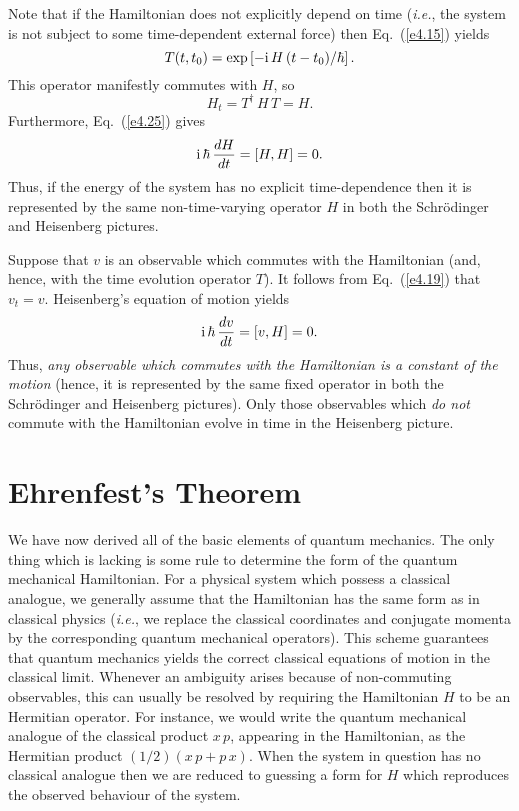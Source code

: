Note that if the Hamiltonian does not explicitly depend on time ({\em i.e.}, the system is
not subject to some time-dependent external force) then Eq.~(\ref{e4.15}) yields
\begin{equation}\label{e4.28}
T(t, t_0) = \exp\left[-{\rm i}\, H\,(t-t_0)/\hbar \right].
\end{equation}
This operator manifestly commutes with $H$, so 
\begin{equation}
H_t = T^{\dag}\, H \,T = H.
\end{equation}
Furthermore, Eq.~(\ref{e4.25}) gives
\begin{equation}
{\rm i}\,\hbar \,\frac{dH}{dt} = [H, H] = 0.
\end{equation}
Thus, if the energy of the system  has no explicit time-dependence then it is 
represented by the same non-time-varying operator $H$ in both the Schr\"{o}dinger
and Heisenberg pictures. 

Suppose that $v$ is an observable which commutes with the Hamiltonian
(and, hence, with the time evolution operator $T$). It follows from Eq.~(\ref{e4.19})
that $v_t= v$. Heisenberg's equation of motion yields
\begin{equation}
{\rm i}\,\hbar \,\frac{d v}{dt} = [v, H] = 0.
\end{equation}
Thus, {\em any observable which commutes with the Hamiltonian is a constant
of the motion} (hence, it is represented by the same fixed operator in
both the Schr\"{o}dinger and Heisenberg pictures). Only those observables
which {\em do not} commute with the Hamiltonian evolve 
in time in the Heisenberg picture.

\section{Ehrenfest's Theorem}
We have now derived all of the basic elements of quantum mechanics. The only
thing which is lacking is some rule  to determine the form of the 
quantum mechanical Hamiltonian. For a physical system which possess a classical
analogue, we generally assume that the Hamiltonian has the same form as
in classical physics ({\em i.e.}, we replace the classical coordinates and conjugate
momenta by the corresponding quantum mechanical operators). This scheme guarantees
that quantum mechanics yields the correct classical equations of motion
in the classical limit. Whenever an ambiguity arises because of 
non-commuting
observables, this can usually be resolved by requiring the Hamiltonian $H$ to
be an Hermitian operator. For instance, we would write the
quantum mechanical analogue of the classical product $x\,p$, appearing in the
Hamiltonian, as the Hermitian product $(1/2)(x\,p + p\,x)$. When the system
in question has no classical analogue then we are reduced to guessing a form
for $H$ which reproduces the observed behaviour of the system. 

